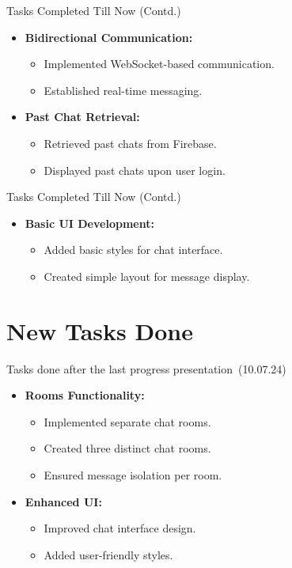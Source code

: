 \documentclass{beamer}
\begin{document}
\begin{frame}{Tasks Completed Till Now (Contd.)}
    \begin{itemize}
        \item \textbf{Bidirectional Communication:}
        \begin{itemize}
            \item Implemented WebSocket-based communication.
            \item Established real-time messaging.
        \end{itemize}
        \item \textbf{Past Chat Retrieval:}
        \begin{itemize}
            \item Retrieved past chats from Firebase.
            \item Displayed past chats upon user login.
        \end{itemize}
    \end{itemize}
\end{frame}

\begin{frame}{Tasks Completed Till Now (Contd.)}
    \begin{itemize}
        \item \textbf{Basic UI Development:}
        \begin{itemize}
            \item Added basic styles for chat interface.
            \item Created simple layout for message display.
        \end{itemize}
    \end{itemize}
\end{frame}

\section{New Tasks Done}

\begin{frame}{Tasks done after the last progress presentation (10.07.24)}
    \begin{itemize}
        \item \textbf{Rooms Functionality:}
        \begin{itemize}
            \item Implemented separate chat rooms.
            \item Created three distinct chat rooms.
            \item Ensured message isolation per room.
        \end{itemize}
        \item \textbf{Enhanced UI:}
        \begin{itemize}
            \item Improved chat interface design.
            \item Added user-friendly styles.
        \end{itemize}
    \end{itemize}
\end{frame}
\end{document}
